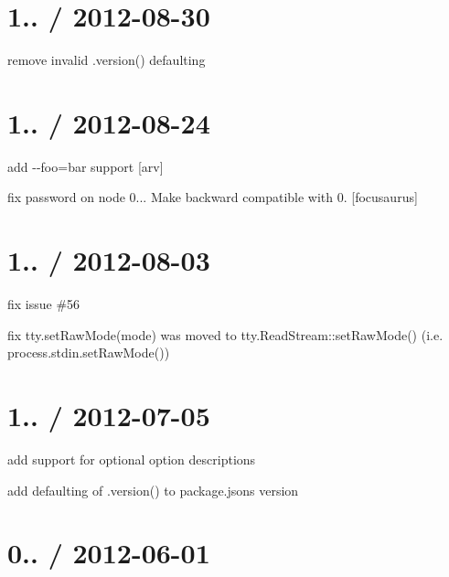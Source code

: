 \section*{1.. / 2012-\/08-\/30 }


\begin{DoxyItemize}
\item remove invalid .version() defaulting
\end{DoxyItemize}

\section*{1.. / 2012-\/08-\/24 }


\begin{DoxyItemize}
\item add {\ttfamily -\/-\/foo=bar} support \mbox{[}arv\mbox{]}
\item fix password on node 0... Make backward compatible with 0. \mbox{[}focusaurus\mbox{]}
\end{DoxyItemize}

\section*{1.. / 2012-\/08-\/03 }


\begin{DoxyItemize}
\item fix issue \#56
\item fix tty.\+set\+Raw\+Mode(mode) was moved to tty.\+Read\+Stream\+::set\+Raw\+Mode() (i.\+e. process.\+stdin.\+set\+Raw\+Mode())
\end{DoxyItemize}

\section*{1.. / 2012-\/07-\/05 }


\begin{DoxyItemize}
\item add support for optional option descriptions
\item add defaulting of {\ttfamily .version()} to package.\+json\textquotesingle{}s version
\end{DoxyItemize}

\section*{0.. / 2012-\/06-\/01 }


